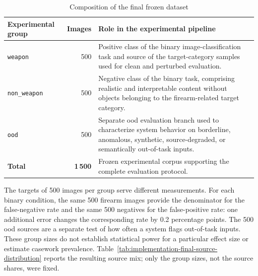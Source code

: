 \begin{table}[H]
\centering
\small
\renewcommand{\arraystretch}{1.15}
\setlength{\tabcolsep}{5pt}
\caption{Composition of the final frozen dataset}
\label{tab:implementation-frozen-dataset-composition}
\begin{tabularx}{0.92\textwidth}{@{}l r X@{}}
\toprule
\textbf{Experimental group} &
\textbf{Images} &
\textbf{Role in the experimental pipeline} \\
\midrule

\texttt{weapon}
&
500
&
Positive class of the binary image-classification task and source of the
target-category samples used for clean and perturbed evaluation. \\

\texttt{non\_weapon}
&
500
&
Negative class of the binary task, comprising realistic and interpretable
content without objects belonging to the firearm-related target category. \\

\texttt{ood}
&
500
&
Separate \gls{ood} evaluation branch used to characterize system behavior on
borderline, anomalous, synthetic, source-degraded, or semantically out-of-task
inputs. \\

\midrule
\textbf{Total}
&
\textbf{1\,500}
&
Frozen experimental corpus supporting the complete evaluation protocol. \\

\bottomrule
\end{tabularx}
\end{table}

The targets of 500 images per group serve different measurements. For each
binary condition, the same 500 firearm images provide the denominator for
the false-negative rate and the same 500 negatives for the false-positive
rate: one additional error changes the corresponding rate by 0.2 percentage
points. The 500 \gls{ood} sources are a separate test of how often a system
flags out-of-task inputs. These group sizes do not establish statistical
power for a particular effect size or estimate casework prevalence.
Table~\ref{tab:implementation-final-source-distribution} reports the
resulting source mix; only the group sizes, not the source shares, were fixed.

